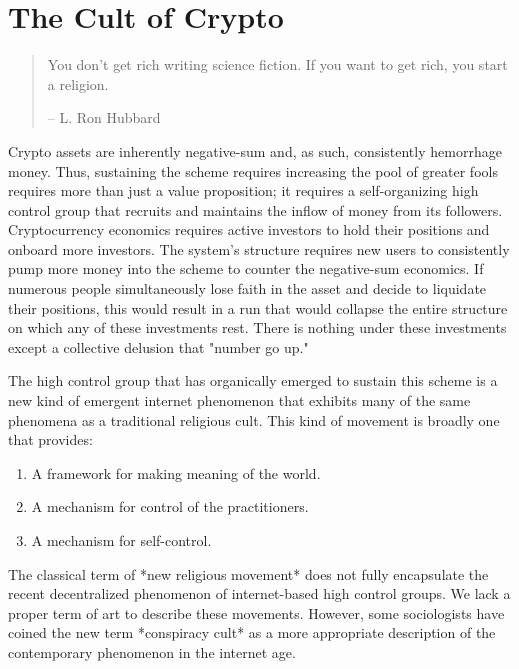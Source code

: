 \chapter{The Cult of Crypto}

\begin{quote}
You don't get rich writing science fiction. If you want to get rich, you start
a religion.
\begin{flushright}
-- L. Ron Hubbard
\end{flushright}
\end{quote}


Crypto assets are inherently negative-sum and, as such, consistently hemorrhage
money. Thus, sustaining the scheme requires increasing the pool of greater fools
requires more than just a value proposition; it requires a self-organizing high
control group that recruits and maintains the inflow of money from its
followers. Cryptocurrency economics requires active investors to hold their
positions and onboard more investors. The system's structure requires new users
to consistently pump more money into the scheme to counter the negative-sum
economics. If numerous people simultaneously lose faith in the asset and decide
to liquidate their positions, this would result in a run that would collapse the
entire structure on which any of these investments rest. There is nothing under
these investments except a collective delusion that "number go up."

The high control group that has organically emerged to sustain this scheme is a
new kind of emergent internet phenomenon that exhibits many of the same
phenomena as a traditional religious cult. This kind of movement is broadly one
that provides:

\begin{enumerate}
  \item A framework for making meaning of the world.
  \item A mechanism for control of the practitioners.
  \item A mechanism for self-control.
\end{enumerate}

The classical term of *new religious movement* does not fully encapsulate the
recent decentralized phenomenon of internet-based high control groups. We lack a
proper term of art to describe these movements. However, some sociologists have
coined the new term *conspiracy cult* as a more appropriate description of the
contemporary phenomenon in the internet age.

